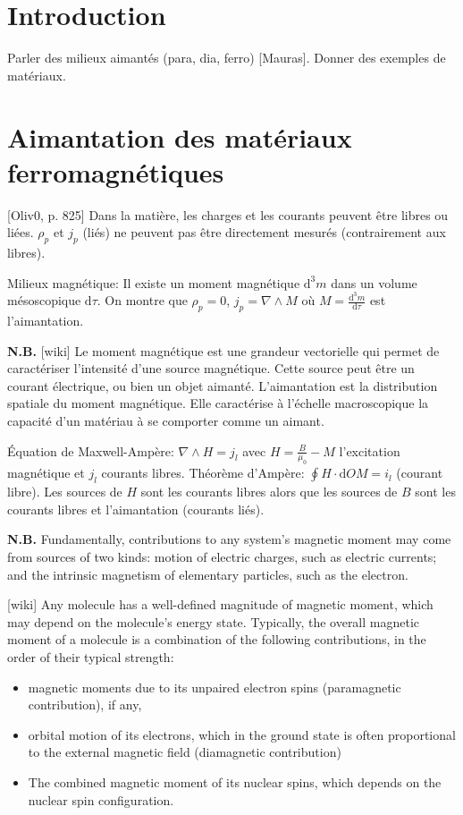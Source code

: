 \documentclass[11pt]{report}
\numberwithin{figure}{section}
\numberwithin{equation}{section}
\numberwithin{table}{section}
\newcommand{\ud}{\mathrm{d}}
\newcommand{\1}{\boldsymbol{1}}
\begin{document}
\section*{Introduction}
 
Parler des milieux aimantés (para, dia, ferro) [Mauras]. Donner des exemples de matériaux.
  
\section{Aimantation des matériaux ferromagnétiques}  

[Oliv0, p. 825] Dans la matière, les charges et les courants peuvent être libres ou liées. $\rho_p$ et $j_p$ (liés) ne peuvent pas être directement mesurés (contrairement aux libres). 

Milieux magnétique: Il existe un moment magnétique $\ud^3 m$ dans un volume mésoscopique $\ud \tau$. On montre que $\rho_p = 0$, $j_p = \nabla \wedge M$ où $M = \frac{\ud^3 m}{\ud \tau}$ est l'aimantation.

\textbf{N.B.} [wiki] Le moment magnétique est une grandeur vectorielle qui permet de caractériser l'intensité d'une source magnétique. Cette source peut être un courant électrique, ou bien un objet aimanté. L'aimantation est la distribution spatiale du moment magnétique. Elle  caractérise à l'échelle macroscopique la capacité d'un matériau à se comporter comme un aimant.

Équation de Maxwell-Ampère: $\nabla \wedge H = j_l$ avec $H = \frac{B}{\mu_0} - M$ l'excitation magnétique et $j_l$ courants libres. Théorème d'Ampère: $\oint H \cdot \ud OM = i_l$ (courant libre). Les sources de $H$ sont les courants libres alors que les sources de $B$ sont les courants libres et l'aimantation (courants liés).

\textbf{N.B.} Fundamentally, contributions to any system's magnetic moment may come from sources of two kinds: motion of electric charges, such as electric currents; and the intrinsic magnetism of elementary particles, such as the electron.

[wiki] Any molecule has a well-defined magnitude of magnetic moment, which may depend on the molecule's energy state. Typically, the overall magnetic moment of a molecule is a combination of the following contributions, in the order of their typical strength:

\begin{itemize}
\item magnetic moments due to its unpaired electron spins (paramagnetic contribution), if any,
\item orbital motion of its electrons, which in the ground state is often proportional to the external magnetic field (diamagnetic contribution)
\item The combined magnetic moment of its nuclear spins, which depends on the nuclear spin configuration.
\end{itemize} 
\end{document}
